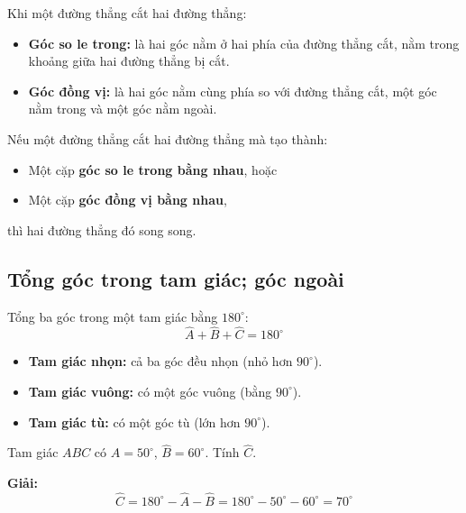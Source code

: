 \documentclass[12pt,a4paper]{article}
\begin{document}
\begin{tinhchat}[title={Đường thẳng cắt hai đường thẳng}]
Khi một đường thẳng cắt hai đường thẳng:
\begin{itemize}
  \item \textbf{Góc so le trong:} là hai góc nằm ở hai phía của đường thẳng cắt, nằm trong khoảng giữa hai đường thẳng bị cắt.
  \item \textbf{Góc đồng vị:} là hai góc nằm cùng phía so với đường thẳng cắt, một góc nằm trong và một góc nằm ngoài.
\end{itemize}
\end{tinhchat}

\begin{dinhly}[title={Dấu hiệu nhận biết hai đường thẳng song song}]
Nếu một đường thẳng cắt hai đường thẳng mà tạo thành:
\begin{itemize}
  \item Một cặp \textbf{góc so le trong bằng nhau}, hoặc
  \item Một cặp \textbf{góc đồng vị bằng nhau},
\end{itemize}
thì hai đường thẳng đó song song.
\end{dinhly}

\subsection{Tổng góc trong tam giác; góc ngoài}

\begin{dinhly}[title={Tổng ba góc trong tam giác}]
Tổng ba góc trong một tam giác bằng $180^\circ$:
\[
  \widehat{A} + \widehat{B} + \widehat{C} = 180^\circ
\]
\end{dinhly}

\begin{dinhnghia}[title={Phân loại tam giác theo góc}]
\begin{itemize}
  \item \textbf{Tam giác nhọn:} cả ba góc đều nhọn (nhỏ hơn $90^\circ$).
  \item \textbf{Tam giác vuông:} có một góc vuông (bằng $90^\circ$).
  \item \textbf{Tam giác tù:} có một góc tù (lớn hơn $90^\circ$).
\end{itemize}
\end{dinhnghia}

\begin{vidu}
Tam giác $ABC$ có $\widehat{A} = 50^\circ$, $\widehat{B} = 60^\circ$. Tính $\widehat{C}$.

\textbf{Giải:}
\[
  \widehat{C} = 180^\circ - \widehat{A} - \widehat{B} = 180^\circ - 50^\circ - 60^\circ = 70^\circ
\]
\end{vidu}
\end{document}
